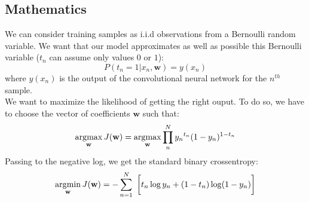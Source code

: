 \subsection{Mathematics}
We can consider training samples as i.i.d observations from a Bernoulli random variable. We want that our model approximates as well as possible this Bernoulli variable ($t_n$ can assume only values $0$ or $1$):
\begin{equation}
P(t_n = 1|x_n, \textbf{w}) = y(x_n)
\end{equation}
where $y(x_n)$ is the output of the convolutional neural network for the $n^{th}$ sample.
\\
We want to maximize the likelihood of getting the right ouput. To do so, we have to choose the vector of coefficients $\textbf{w}$ such that:
\begin{equation}
\operatorname*{\arg\!\max} _{\textbf{w}} J(\textbf{w}) = \operatorname*{\arg\!\max} _{\textbf{w}} \prod _n^N {y_n}^{t_n}(1-y_n)^{1-t_n}
\end{equation}
Passing to the negative log, we get the standard binary crossentropy:
\begin{equation}
\operatorname*{\arg\!\min} _{\textbf{w}} J(\textbf{w}) = - \sum _{n=1}^{N}\ {\bigg [}t_{n}\log {y_n}+(1-t_{n})\log(1-{y_n}){\bigg ]}
\end{equation}


